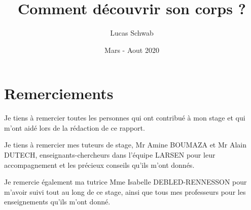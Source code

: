 \documentclass[11pt,french]{report}
\title{Comment découvrir son corps ?}
\author{Lucas Schwab}
\date{Mars - Aout 2020}
\begin{document}
\maketitle








\tableofcontents

\chapter{Remerciements}

Je tiens à remercier toutes les personnes qui ont contribué à mon stage et qui m'ont aidé lors de la rédaction de ce rapport.

Je tiens à remercier mes tuteurs de stage, Mr Amine BOUMAZA et Mr Alain DUTECH, enseignants-chercheurs dans l'équipe LARSEN pour leur accompagnement et les précieux conseils qu'ils m'ont donnés.

Je remercie également ma tutrice Mme Isabelle DEBLED-RENNESSON pour m'avoir suivi tout au long de ce stage, ainsi que tous mes professeurs pour les enseignements qu'ils m'ont donné.
\end{document}
